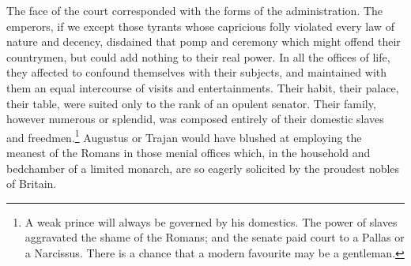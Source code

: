 The face of the court corresponded with the forms of the administration. The emperors, if we except those tyrants whose capricious folly violated every law of nature and decency, disdained that pomp and ceremony which might offend their countrymen, but could add nothing to their real power. In all the offices of life, they affected to confound themselves with their subjects, and maintained with them an equal intercourse of visits and entertainments. Their habit, their palace, their table, were suited only to the rank of an opulent senator. Their family, however numerous or splendid, was composed entirely of their domestic slaves and freedmen.\footnote{A weak prince will always be governed by his domestics. The power of slaves aggravated the shame of the Romans; and the senate paid court to a Pallas or a Narcissus. There is a chance that a modern favourite may be a gentleman.} Augustus or Trajan would have blushed at employing the meanest of the Romans in those menial offices which, in the household and bedchamber of a limited monarch, are so eagerly solicited by the proudest nobles of Britain.

